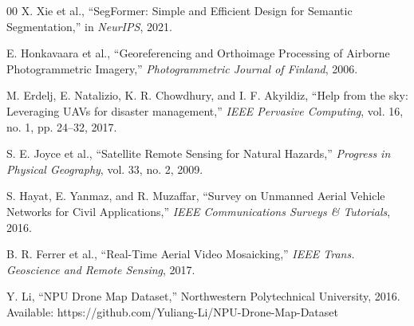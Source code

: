 \documentclass[conference]{IEEEtran}
\begin{document}
\begin{thebibliography}{00}
X. Xie et al., ``SegFormer: Simple and Efficient Design for Semantic Segmentation,'' in \textit{NeurIPS}, 2021.

E. Honkavaara et al., ``Georeferencing and Orthoimage Processing of Airborne Photogrammetric Imagery,'' \textit{Photogrammetric Journal of Finland}, 2006.

M. Erdelj, E. Natalizio, K. R. Chowdhury, and I. F. Akyildiz, ``Help from the sky: Leveraging UAVs for disaster management,'' \textit{IEEE Pervasive Computing}, vol. 16, no. 1, pp. 24--32, 2017.

S. E. Joyce et al., ``Satellite Remote Sensing for Natural Hazards,'' \textit{Progress in Physical Geography}, vol. 33, no. 2, 2009.

S. Hayat, E. Yanmaz, and R. Muzaffar, ``Survey on Unmanned Aerial Vehicle Networks for Civil Applications,'' \textit{IEEE Communications Surveys \& Tutorials}, 2016.

B. R. Ferrer et al., ``Real-Time Aerial Video Mosaicking,'' \textit{IEEE Trans. Geoscience and Remote Sensing}, 2017.

Y. Li, ``NPU Drone Map Dataset,'' Northwestern Polytechnical University, 2016. Available: https://github.com/Yuliang-Li/NPU-Drone-Map-Dataset

\end{thebibliography}
\end{document}
